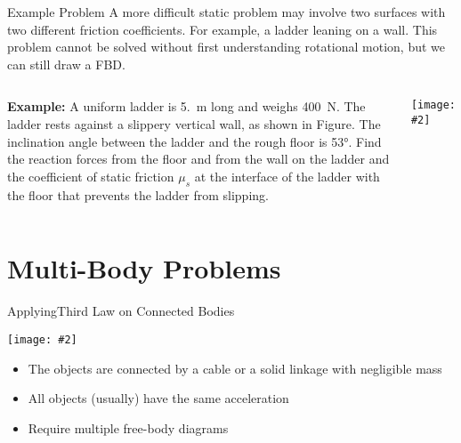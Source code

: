 \documentclass[12pt,compress,aspectratio=169]{beamer}
\newcommand{\pic}[2]{\texttt{[image: \#2]}}
\begin{document}
\begin{frame}{Example Problem}
  A more difficult static problem may involve two surfaces with two different
  friction coefficients. For example, a ladder leaning on a wall. This problem
  cannot be solved without first understanding rotational motion, but we can
  still draw a FBD.
  \vspace{.2in}
  \begin{columns}
    \textbf{Example:} A uniform ladder is \SI{5.}{\metre} long and weighs
    \SI{400}{\newton}. The ladder rests against a slippery vertical wall, as
    shown in Figure. The inclination angle between the ladder and the rough
    floor is \ang{53}. Find the reaction forces from the floor and
    from the wall on the ladder and the coefficient of static friction $\mu_s$
    at the interface of the ladder with the floor that prevents the ladder from
    slipping.

    \pic{1}{graphics/ladder}
  \end{columns}
\end{frame}



\section{Multi-Body Problems}

\begin{frame}{ApplyingThird Law on Connected Bodies}
  \begin{center}
    \pic{.7}{graphics/worldslongestroadtrainwithpowertrailer8}
  \end{center}
  \begin{itemize}
  \item The objects are connected by a cable or a solid linkage with negligible
    mass
  \item All objects (usually) have the same acceleration
  \item Require multiple free-body diagrams
  \end{itemize}
\end{frame}
\end{document}
